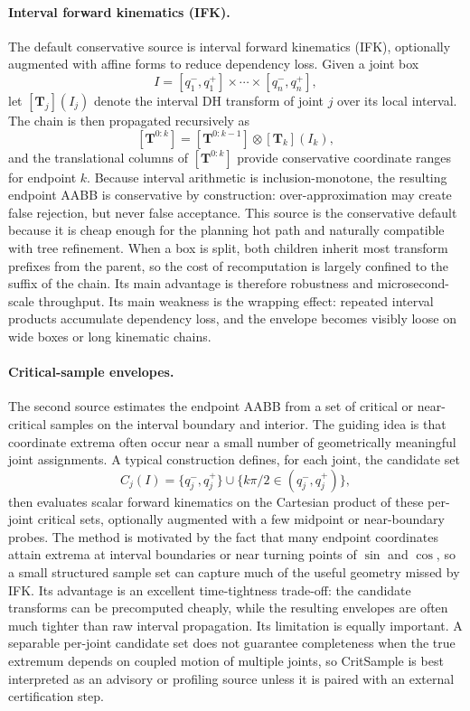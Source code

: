 \documentclass[journal]{IEEEtran}
\begin{document}
\paragraph{Interval forward kinematics (IFK).}
The default conservative source is interval forward kinematics (IFK), optionally
augmented with affine forms to reduce dependency loss. Given a joint box
\[
I = [q_1^-,q_1^+] \times \cdots \times [q_n^-,q_n^+],
\]
let $[\bm{T}_j](I_j)$ denote the interval DH transform of joint $j$ over its
local interval. The chain is then propagated recursively as
\[
[\bm{T}^{0:k}] = [\bm{T}^{0:k-1}] \otimes [\bm{T}_k](I_k),
\]
and the translational columns of $[\bm{T}^{0:k}]$ provide conservative
coordinate ranges for endpoint $k$. Because interval arithmetic is
inclusion-monotone, the resulting endpoint AABB is conservative by
construction: over-approximation may create false rejection, but never false
acceptance. This source is the conservative default because it is cheap enough for
the planning hot path and naturally compatible with tree refinement. When a box
is split, both children inherit most transform prefixes from the parent, so the
cost of recomputation is largely confined to the suffix of the chain. Its main
advantage is therefore robustness and microsecond-scale throughput. Its main
weakness is the wrapping effect: repeated interval products accumulate
dependency loss, and the envelope becomes visibly loose on wide boxes or long
kinematic chains.

\paragraph{Critical-sample envelopes.}
The second source estimates the endpoint AABB from a set of critical or
near-critical samples on the interval boundary and interior. The guiding idea is
that coordinate extrema often occur near a small number of geometrically
meaningful joint assignments. A typical construction defines, for each joint,
the candidate set
\[
C_j(I) = \{q_j^-, q_j^+\} \cup \{k\pi/2 \in (q_j^-, q_j^+)\},
\]
then evaluates scalar forward kinematics on the Cartesian product of these
per-joint critical sets, optionally augmented with a few midpoint or
near-boundary probes. The method is motivated by the fact that many endpoint
coordinates attain extrema at interval boundaries or near turning points of
$\sin$ and $\cos$, so a small structured sample set can capture much of the
useful geometry missed by IFK. Its advantage is an excellent time-tightness
trade-off: the candidate transforms can be precomputed cheaply, while the
resulting envelopes are often much tighter than raw interval propagation. Its
limitation is equally important. A separable per-joint candidate set does not
guarantee completeness when the true extremum depends on coupled motion of
multiple joints, so CritSample is best interpreted as an advisory or profiling
source unless it is paired with an external certification step.
\end{document}
